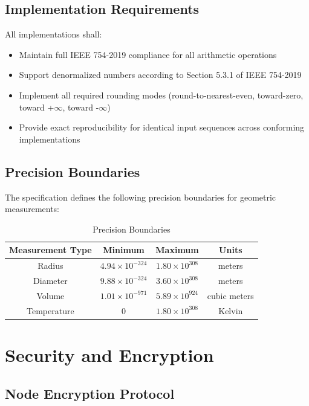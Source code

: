 \documentclass[12pt]{book}
\begin{document}
\section{Implementation Requirements}

All implementations shall:

\begin{itemize}
\item Maintain full IEEE 754-2019 compliance for all arithmetic operations
\item Support denormalized numbers according to Section 5.3.1 of IEEE 754-2019
\item Implement all required rounding modes (round-to-nearest-even, toward-zero, toward +$\infty$, toward -$\infty$)
\item Provide exact reproducibility for identical input sequences across conforming implementations
\end{itemize}

\section{Precision Boundaries}

The specification defines the following precision boundaries for geometric measurements:

\begin{table}[h]
\centering
\begin{tabular}{|c|c|c|c|}
\hline
Measurement Type & Minimum & Maximum & Units \\
\hline
Radius & $4.94 \times 10^{-324}$ & $1.80 \times 10^{308}$ & meters \\
\hline
Diameter & $9.88 \times 10^{-324}$ & $3.60 \times 10^{308}$ & meters \\
\hline
Volume & $1.01 \times 10^{-971}$ & $5.89 \times 10^{924}$ & cubic meters \\
\hline
Temperature & 0 & $1.80 \times 10^{308}$ & Kelvin \\
\hline
\end{tabular}
\caption{Precision Boundaries}
\end{table}

\chapter{Security and Encryption}

\section{Node Encryption Protocol}
\end{document}
